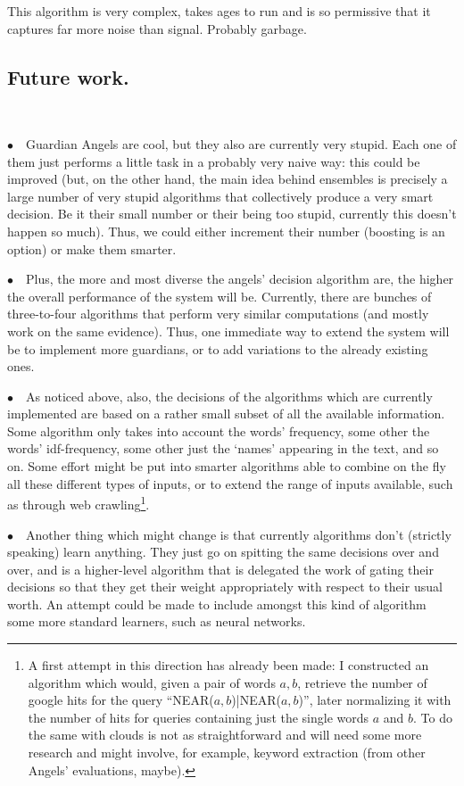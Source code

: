 \documentclass[11pt]{article}
\begin{document}
This algorithm is very complex, takes ages to run and is so permissive that it captures far more noise than signal. Probably garbage.


\subsection{Future work.}
~

$\bullet \quad$Guardian Angels are cool, but they also are currently very stupid. Each one of them just performs a little task in a probably very naive way: this could be improved (but, on the other hand, the main idea behind ensembles is precisely a large number of very stupid algorithms that collectively produce a very smart decision. Be it their small number or their being too stupid, currently this doesn't happen so much). Thus, we could either increment their number (boosting is an option) or make them smarter.

$\bullet \quad$Plus, the more and most diverse the angels' decision algorithm are, the higher the overall performance of the system will be. Currently, there are bunches of three-to-four algorithms that perform very similar computations (and mostly work on the same evidence). Thus, one immediate way to extend the system will be to implement more guardians, or to add variations to the already existing ones.

$\bullet \quad$As noticed above, also, the decisions of the algorithms which are currently implemented are based on a rather small subset of all the available information. Some algorithm only takes into account the words' frequency, some other the words' idf-frequency, some other just the `names' appearing in the text, and so on. Some effort might be put into smarter algorithms able to combine on the fly all these different types of inputs, or to extend the range of inputs available, such as through web crawling\footnote{
A first attempt in this direction has already been made: I constructed an algorithm which would, given a pair of words $a,b$, retrieve the number of google hits for the query ``NEAR($a,b$)|NEAR($a,b$)'', later normalizing it with the number of hits for queries containing just the single words $a$ and $b$. To do the same with clouds is not as straightforward and will need some more research and might involve, for example, keyword extraction (from other Angels' evaluations, maybe).}.

$\bullet \quad$Another thing which might change is that currently algorithms don't (strictly speaking) learn anything. They just go on spitting the same decisions over and over, and is a higher-level algorithm that is delegated the work of gating their decisions so that they get their weight appropriately with respect to their usual worth. An attempt could be made to include amongst this kind of algorithm some more standard learners, such as neural networks.
\end{document}
